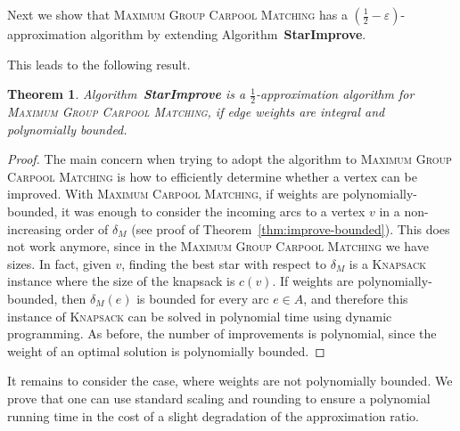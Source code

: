 \documentclass[11pt]{article}
\newtheorem{theorem}{Theorem}
\newcommand{\half}{\frac{1}{2}}
\newcommand{\carpool}{\textsc{Maximum Carpool Matching}\xspace}
\newcommand{\gcp}{\textsc{Maximum Group Carpool Matching}\xspace}
\newcommand{\eps}{\varepsilon}
\begin{document}

Next we show that \gcp has a $(\half -\eps)$-approximation algorithm
by extending Algorithm~\textbf{StarImprove}.
%

%
This leads to the following result.

\begin{theorem}
Algorithm~\textbf{StarImprove} is a $\half$-approximation algorithm
for \gcp, if edge weights are integral and polynomially bounded.
\end{theorem}
\begin{proof}
The main concern when trying to adopt the algorithm to \gcp is how to
efficiently determine whether a vertex can be improved.
%
With \carpool, if weights are polynomially-bounded, it was enough to
consider the incoming arcs to a vertex $v$ in a non-increasing order
of $\delta_M$ (see proof of Theorem~\ref{thm:improve-bounded}).  This
does not work anymore, since in the \gcp we have sizes.  In fact,
given $v$, finding the best star with respect to $\delta_M$ is a
\textsc{Knapsack} instance where the size of the knapsack is $c(v)$.
%
If weights are polynomially-bounded, then $\delta_M(e)$ is bounded for
every arc $e \in A$, and therefore this instance of \textsc{Knapsack}
can be solved in polynomial time using dynamic programming.
%
As before, the number of improvements is polynomial, since the weight
of an optimal solution is polynomially bounded.
\end{proof}


It remains to consider the case, where weights are not polynomially
bounded.  We prove that one can use standard scaling and rounding to
ensure a polynomial running time in the cost of a slight degradation
of the approximation ratio.
\end{document}
